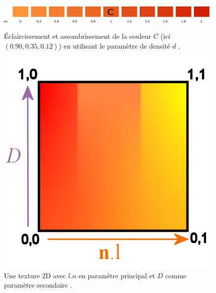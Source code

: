 \begin{figure}[h!]
    \begin{minipage}[b]{0.4\linewidth}
        \centering 
        \includegraphics[width=1.0\linewidth]{Etat_de_l_art/watercolor.pdf}
        \caption{\label{fig:watercolorschema} Éclaircissement et assombrissement de la couleur $C$ (ici $(0.90,0.35,0.12)$) en utilisant le paramètre de densité $d$ \cite{bousseau2006interactive}.}

    \end{minipage}\hfill
    \begin{minipage}[b]{0.40\linewidth}
        \centering 
        \includegraphics[width=0.5\linewidth]{Etat_de_l_art/xToon.png}
 		\caption{\label{fig:xtoontexture} Une texture 2D avec $l.n$ en paramètre principal et $D$ comme paramètre secondaire \cite{barla2006x}. }
    \end{minipage}
\end{figure}




